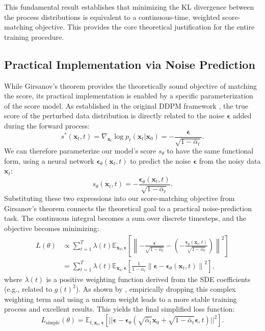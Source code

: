 \documentclass{article}
\begin{document}
This fundamental result \citep{Revuz_Yor_1999} establishes that minimizing the KL divergence between the process distributions is equivalent to a continuous-time, weighted score-matching objective. This provides the core theoretical justification for the entire training procedure.

\subsection{Practical Implementation via Noise Prediction}
While Girsanov's theorem provides the theoretically sound objective of matching the score, its practical implementation is enabled by a specific parameterization of the score model. As established in the original DDPM framework \citep{Ho_Jain_Abbeel_2020}, the true score of the perturbed data distribution is directly related to the noise $\boldsymbol{\epsilon}$ added during the forward process:
$$
s^*(\mathbf{x}_t, t) = \nabla_{\mathbf{x}_t} \log p_t(\mathbf{x}_t | \mathbf{x}_0) = -\frac{\boldsymbol{\epsilon}}{\sqrt{1 - \bar{\alpha}_t}}.
$$
We can therefore parameterize our model's score $s_\theta$ to have the same functional form, using a neural network $\boldsymbol{\epsilon}_\theta(\mathbf{x}_t, t)$ to predict the noise $\boldsymbol{\epsilon}$ from the noisy data $\mathbf{x}_t$:
$$
s_\theta(\mathbf{x}_t, t) = -\frac{\boldsymbol{\epsilon}_\theta(\mathbf{x}_t, t)}{\sqrt{1 - \bar{\alpha}_t}}.
$$
Substituting these two expressions into our score-matching objective from Girsanov's theorem connects the theoretical goal to a practical noise-prediction task. The continuous integral becomes a sum over discrete timesteps, and the objective becomes minimizing:
\begin{align}
L(\theta) &\propto \sum_{t=1}^T \lambda(t) \mathbb{E}_{\mathbf{x}_0, \boldsymbol{\epsilon}} \left[ \left\| -\frac{\boldsymbol{\epsilon}}{\sqrt{1 - \bar{\alpha}_t}} - \left(-\frac{\boldsymbol{\epsilon}_\theta(\mathbf{x}_t, t)}{\sqrt{1 - \bar{\alpha}_t}}\right) \right\|^2 \right] \nonumber \\
&= \sum_{t=1}^T \lambda(t) \mathbb{E}_{\mathbf{x}_0, \boldsymbol{\epsilon}} \left[ \frac{1}{1 - \bar{\alpha}_t} \left\| \boldsymbol{\epsilon} - \boldsymbol{\epsilon}_\theta(\mathbf{x}_t, t) \right\|^2 \right],
\end{align}
where $\lambda(t)$ is a positive weighting function derived from the SDE coefficients (e.g., related to $g(t)^2$). As shown by \citet{Ho_Jain_Abbeel_2020}, empirically dropping this complex weighting term and using a uniform weight leads to a more stable training process and excellent results. This yields the final simplified loss function:
\begin{equation}
    L_{\text{simple}}(\theta) = \mathbb{E}_{t, \mathbf{x}_0, \boldsymbol{\epsilon}} \left[ || \boldsymbol{\epsilon} - \boldsymbol{\epsilon}_\theta(\sqrt{\bar{\alpha}_t} \mathbf{x}_0 + \sqrt{1 - \bar{\alpha}_t} \boldsymbol{\epsilon}, t) ||^2 \right].
\end{equation}
\end{document}
